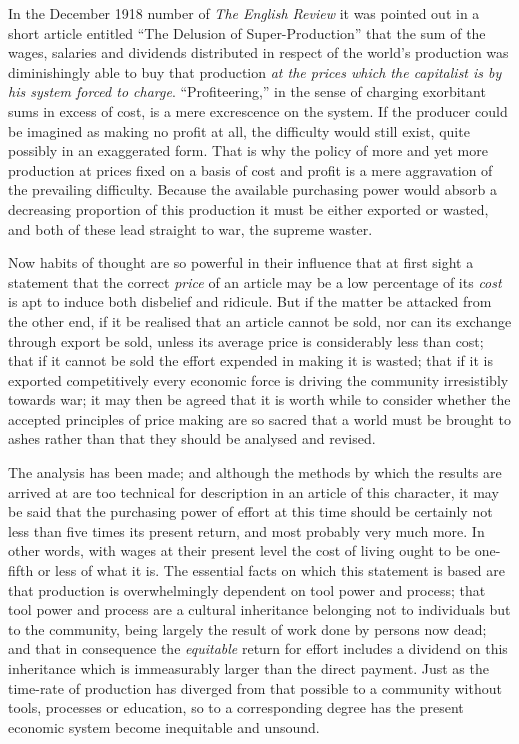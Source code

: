 \documentclass{book}
\begin{document}
In the December 1918 number of \emph{The English Review} it was pointed out in a short article entitled “The Delusion of Super-Production” that the sum of the wages, salaries and dividends distributed in respect of the world’s production was diminishingly able to buy that production \emph{at the prices which the capitalist is by his system forced to charge}. “Profiteering,” in the sense of charging exorbitant sums in excess of cost, is a mere excrescence on the system. If the producer could be imagined as making no profit at all, the difficulty would still exist, quite possibly in an exaggerated form. That is why the policy of more and yet more production at prices fixed on a basis of cost and profit is a mere aggravation of the prevailing difficulty. Because the available purchasing power would absorb a decreasing proportion of this production it must be either exported or wasted, and both of these lead straight to war, the supreme waster.

Now habits of thought are so powerful in their influence that at first sight a statement that the correct \emph{price} of an article may be a low percentage of its \emph{cost} is apt to induce both disbelief and ridicule. But if the matter be attacked from the other end, if it be realised that an article cannot be sold, nor can its exchange through export be sold, unless its average price is considerably less than cost; that if it cannot be sold the effort expended in making it is wasted; that if it is exported competitively every economic force is driving the community irresistibly towards war; it may then be agreed that it is worth while to consider whether the accepted principles of price making are so sacred that a world must be brought to ashes rather than that they should be analysed and revised.

The analysis has been made; and although the methods by which the results are arrived at are too technical for description in an article of this character, it may be said that the purchasing power of effort at this time should be certainly not less than five times its present return, and most probably very much more. In other words, with wages at their present level the cost of living ought to be one-fifth or less of what it is. The essential facts on which this statement is based are that production is overwhelmingly dependent on tool power and process; that tool power and process are a cultural inheritance belonging not to individuals but to the community, being largely the result of work done by persons now dead; and that in consequence the \emph{equitable} return for effort includes a dividend on this inheritance which is immeasurably larger than the direct payment. Just as the time-rate of production has diverged from that possible to a community without tools, processes or education, so to a corresponding degree has the present economic system become inequitable and unsound.
\end{document}
